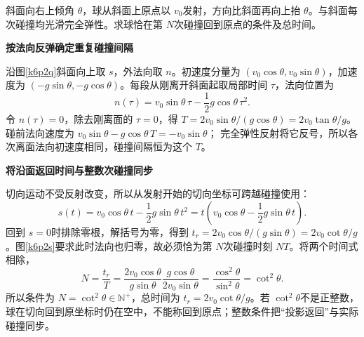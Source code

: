 \begin{question}\begin{example}[斜面弹跳后回到原点]\label{k6p2}
斜面向右上倾角 $\theta$，球从斜面上原点以 $v_0$发射，方向比斜面再向上抬 $\theta$。与斜面每次碰撞均光滑完全弹性。求球恰在第 $N$次碰撞回到原点的条件及总时间。\end{example}
\end{question}
\begin{solution}\textbf{按法向反弹确定重复碰撞间隔}\par\nobreak
沿图\ref{k6p2q}斜面向上取 $s$，外法向取 $n$。初速度分量为 $(v_0\cos\theta,v_0\sin\theta)$，加速度为 $(-g\sin\theta,-g\cos\theta)$。每段从刚离开斜面起取局部时间 $\tau$，法向位置为
\[
n(\tau)=v_0\sin\theta\,\tau-\frac12g\cos\theta\,\tau^2.
\]
令 $n(\tau)=0$，除去刚离面的 $\tau=0$，得
$T=2v_0\sin\theta/(g\cos\theta)=2v_0\tan\theta/g$。
碰前法向速度为 $v_0\sin\theta-g\cos\theta\,T=-v_0\sin\theta$；
完全弹性反射将它反号，所以各次离面法向初速度相同，碰撞间隔恒为这个 $T$。



\par\medskip{}\noindent\textbf{将沿面返回时间与整数次碰撞同步}\par\nobreak
切向运动不受反射改变，所以从发射开始的切向坐标可跨越碰撞使用：
\[
 s(t)=v_0\cos\theta\,t-\frac12g\sin\theta\,t^2
 =t\left(v_0\cos\theta-\frac12g\sin\theta\,t\right).
\]
回到 $s=0$时排除零根，解括号为零，得到 $t_r=2v_0\cos\theta/(g\sin\theta)=2v_0\cot\theta/g$。图\ref{k6p2s}要求此时法向也归零，故必须恰为第 $N$次碰撞时刻 $NT$。将两个时间式相除，
\[
 N=\frac{t_r}{T}
 =\frac{2v_0\cos\theta}{g\sin\theta}
   \frac{g\cos\theta}{2v_0\sin\theta}
 =\frac{\cos^2\theta}{\sin^2\theta}=\cot^2\theta.
\]
所以条件为 $\boxed{N=\cot^2\theta\in\mathbb N^+}$，总时间为 $\boxed{t_r=2v_0\cot\theta/g}$。若 $\cot^2\theta$不是正整数，球在切向回到原坐标时仍在空中，不能称回到原点；整数条件把“投影返回”与实际碰撞同步。\end{solution}

